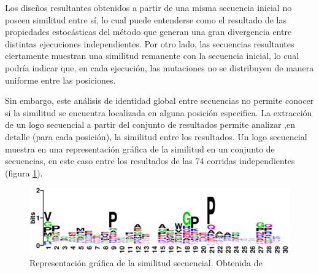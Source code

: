 Los diseños resultantes obtenidos a partir de una misma secuencia inicial no poseen similitud entre sí, lo cual puede entenderse como el resultado de las propiedades estocásticas del método que generan 
una gran divergencia entre distintas ejecuciones independientes.
Por otro lado, las secuencias resultantes ciertamente muestran una similitud remanente con la secuencia inicial, lo cual podría indicar que, en cada ejecución, las mutaciones no se distribuyen de manera uniforme entre las posiciones.

Sin embargo, este análisis de identidad global entre secuencias no permite conocer si la similitud se encuentra localizada en alguna posición especifica.
La extracción de un logo secuencial a partir del conjunto de resultados permite analizar ,en detalle (para cada posición), la similitud entre los resultados. 
Un logo secuencial muestra en una representación gráfica de la similitud en un conjunto de secuencias\cite{schneider1990sequence}, 
en este caso entre los resultados de las 74 corridas independientes (figura \ref{fig:logo}).

\begin{figure}[htbp]
\includegraphics[width=\textwidth]{img/resultados/logo.png}
\caption{Representación gráfica de la similitud secuencial. Obtenida de \cite{crooks2004weblogo}}
\label{fig:logo}
\end{figure}


